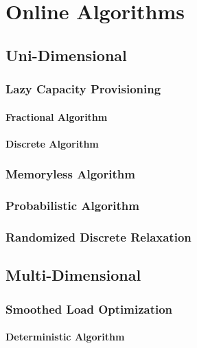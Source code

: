 
\chapter{Online Algorithms}\label{chapter:algorithms}

\section{Uni-Dimensional}

\subsection{Lazy Capacity Provisioning}

\subsubsection{Fractional Algorithm}

\subsubsection{Discrete Algorithm}

\subsection{Memoryless Algorithm}

\subsection{Probabilistic Algorithm}

\subsection{Randomized Discrete Relaxation}

\section{Multi-Dimensional}

\subsection{Smoothed Load Optimization}

\subsubsection{Deterministic Algorithm}

